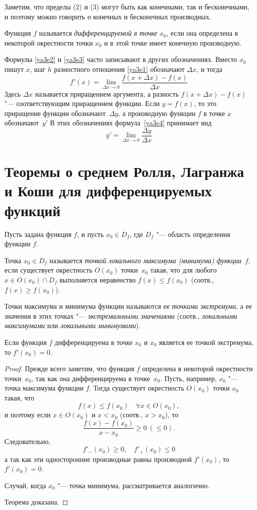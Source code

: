 Заметим, что пределы (2) и (3) могут быть как конечными, так и бесконечными, и поэтому можно говорить о конечных и бесконечных производных. 
\begin{defn} Функция $f$ называется \textit{дифференцируемой в точке} $x_0$, если она определена в некоторой окрестности точки $x_0$ и в этой точке имеет конечную производную.
\end{defn}
Формулы \eqref{ya3e2} и \eqref{ya3e3} часто записывают в других обозначениях. Вместо $x_0$ пишут $x$, шаг $h$ разностного отношения \eqref{ya3e1} обозначают $\Delta x$, и тогда	
\begin{equation}\label{ya3e4}
f'(x)=\lim_{\Delta x\to 0}\limits\frac{f(x+\Delta x)-f(x)}{\Delta x}
\end{equation}
Здесь $\Delta x$ называется приращением аргумента, а разность $f(x+\Delta x)-f(x)$ "--- соответствующим приращением функции. Если $y = f(x)$, то это приращение функции обозначают~$\Delta y$, а производную функции $f$ в точке $x$ обозначают~$y'$ В этих обозначениях формула~\eqref{ya3e4} принимает вид
$$
y'=\lim_{\Delta x \to 0}\limits \frac{\Delta y}{\Delta x}
$$

\section{Теоремы о среднем Ролля, Лагранжа и Коши для дифференцируемых функций}
Пусть задана функция $f$, и пусть $x_0 \in D_f$, где $D_f$ "--- область определения функции $f$.
\begin{defn}
Точка $x_0 \in D_f$ называется \textit{точкой локального максимума (минимума) функции}~$f$, если существует окрестность $O(x_0)$ точки~$x_0$ такая, что для любого $x \in O(x_0)\cap D_f$ выполняется неравенство $f(x) \le f(x_0)$ (соотв., $f(x) \ge f(x_0)$).
\end{defn}
\begin{defn} Точки максимума и минимума функции называются ее \textit{точками экстремума}, а ее значения в этих точках "--- \textit{экстремальными значениями} (соотв., \textit{локальными максимумами} или \textit{локальными минимумами}).
\end{defn}
\begin{thm}\label{ch4n1} 
Если функция $f$ дифференцируема в точке $x_0$ и $x_0$ является ее точкой экстремума, то $f'(x_0) = 0$.
\end{thm}
\begin{proof}
Прежде всего заметим, что функция $f$ определена в некоторой окрестности точки~$x_0$, так как она дифференцируема в точке~$x_0$. Пусть, например, $x_0$ "--- точка максимума функции $f$. Тогда существует окрестность $O(x_0)$ точки $x_0$ такая, что 
$$
f(x) \le f(x_0)\quad \forall x \in O(x_0),
$$
и поэтому если $x \in O(x_0)$ и $x < x_0$ (соотв., $x > x_0$), то
$$
\frac{f(x)-f(x_0)}{x-x_0}\ge0\ (\le 0).
$$
Следовательно,
$$
f'_{-}(x_0)\ge 0, \quad f'_{+}(x_0)\le 0
$$
а так как эти односторонние производные равны производной $f'(x_0)$,
то $f'(x_0) = 0$. 

Случай, когда $x_0$ "--- точка минимума, рассматривается аналогично. 

Теорема доказана.
\end{proof}

